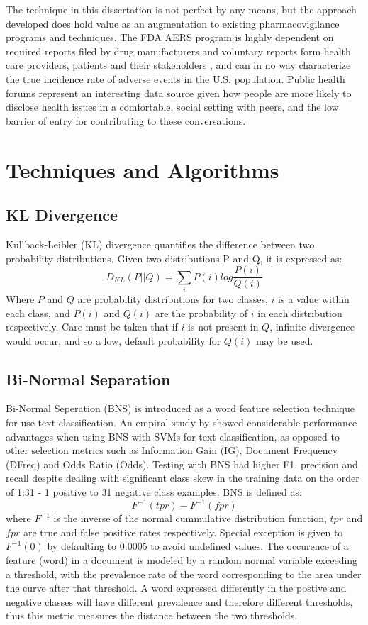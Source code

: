 \documentclass[twoside,11pt]{article}
\begin{document}
The technique in this dissertation is not perfect by any means, but the approach developed does hold value as an augmentation to existing pharmacovigilance programs and techniques. The FDA AERS program is highly dependent on required reports filed by drug manufacturers and voluntary reports form health care providers, patients and their stakeholders \citep{FDA Aers}, and can in no way characterize the true incidence rate of adverse events in the U.S. population. Public health forums represent an interesting data source given how people are more likely to disclose health issues in a comfortable, social setting with peers, and the low barrier of entry for contributing to these conversations.


\section{Techniques and Algorithms}


\subsection{KL Divergence}
Kullback-Leibler (KL) divergence quantifies the difference between two probability distributions. Given two distributions P and Q, it is expressed as:
\[
  D_{KL}(P||Q) = \sum_{i}P(i)log\frac{P(i)}{Q(i)}
\]
Where $P$ and $Q$ are probability distributions for two classes, $i$ is a value within each class, and $P(i)$ and $Q(i)$ are the probability of $i$ in each distribution respectively. Care must be taken that if $i$ is not present in $Q$, infinite divergence would occur, and so a low, default probability for $Q(i)$ may be used.


\subsection{Bi-Normal Separation}
Bi-Normal Seperation (BNS) is introduced as a word feature selection technique for use text classification. An empiral study by \citep{Forman} showed considerable performance advantages when using BNS with SVMs for text classification, as opposed to other selection metrics such as Information Gain (IG), Document Frequency (DFreq) and Odds Ratio (Odds). Testing with BNS had higher F1, precision and recall despite dealing with significant class skew in the training data on the order of 1:31 - 1 positive to 31 negative class examples. BNS is defined as:
\[
  F^{-1}(tpr) - F^{-1}(fpr)
\]
where $F^{-1}$ is the inverse of the normal cummulative distribution function, $tpr$ and $fpr$ are true and false positive rates respectively. Special exception is given to $F^{-1}(0)$ by defaulting to 0.0005 to avoid undefined values. The occurence of a feature (word) in a document is modeled by a random normal variable exceeding a threshold, with the prevalence rate of the word corresponding to the area under the curve after that threshold. A word expressed differently in the postive and negative classes will have different prevalence and therefore different thresholds, thus this metric measures the distance between the two thresholds.
\end{document}

